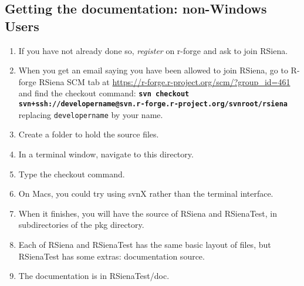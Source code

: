 \documentclass[12pt, a4paper]{article}
\renewcommand{\=}{\,=\,}
\newcommand{\+}{\,+\,}
\newcommand{\sfn}[1]{\textbf{\texttt{#1}}}
\begin{document}
\subsection{Getting the documentation: non-Windows Users}
\begin{enumerate}
\item If you have not already done so, \emph{register} on r-forge and ask to
  join RSiena.
\item When you get an email saying you have been allowed to join RSiena, go to
  R-forge RSiena SCM tab at
  \url{https://r-forge.r-project.org/scm/?group_id=461} and find the checkout
  command: \sfn{\small svn checkout
    svn+ssh://developername@svn.r-forge.r-project.org/svnroot/rsiena} replacing
\verb|developername| by your name.
\item Create a folder to hold the source files.
\item In a terminal window, navigate to this directory.
\item Type the checkout command.
\item On Macs, you could try using \textsf{svnX} rather than the terminal
  interface.
\item When it finishes, you will have the source of RSiena and RSienaTest, in
  subdirectories of the \textsf{pkg} directory.
\item Each of RSiena and RSienaTest has the same basic layout of files, but
  RSienaTest has some extras: documentation source.
\item The documentation is in RSienaTest/doc.
\end{enumerate}
\end{document}
